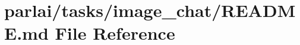 \hypertarget{parlai_2tasks_2image__chat_2README_8md}{}\section{parlai/tasks/image\+\_\+chat/\+R\+E\+A\+D\+ME.md File Reference}
\label{parlai_2tasks_2image__chat_2README_8md}

